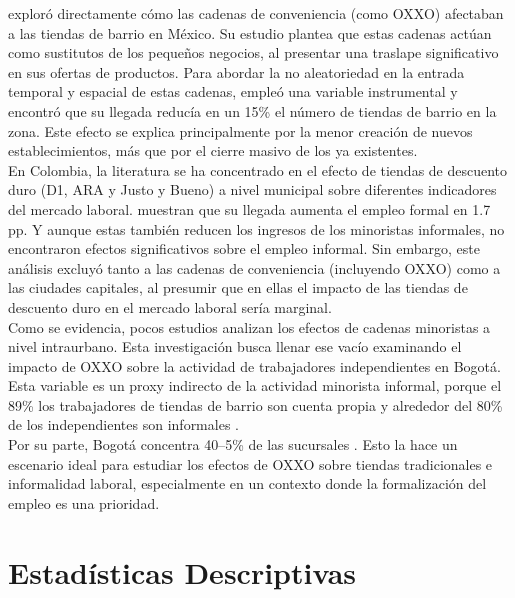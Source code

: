 \documentclass{article}
\begin{document}
\textcite{marcos2022} exploró directamente cómo las cadenas de conveniencia (como OXXO) afectaban a las tiendas de barrio en México. Su estudio plantea que estas cadenas actúan como sustitutos de los pequeños negocios, al presentar una traslape significativo en sus ofertas de productos. Para abordar la no aleatoriedad en la entrada temporal y espacial de estas cadenas, empleó una variable instrumental y encontró que su llegada reducía en un 15\% el número de tiendas de barrio en la zona. Este efecto se explica principalmente por la menor creación de nuevos establecimientos, más que por el cierre masivo de los ya existentes. \\

En Colombia, la literatura se ha concentrado en el efecto de tiendas de descuento duro (D1, ARA y Justo y Bueno) a nivel municipal sobre diferentes indicadores del mercado laboral. \textcite{delgado2024} muestran que su llegada aumenta el empleo formal en 1.7 pp. Y aunque estas también reducen los ingresos de los minoristas informales, no encontraron efectos significativos sobre el empleo informal. Sin embargo, este análisis excluyó tanto a las cadenas de conveniencia (incluyendo OXXO) como a las ciudades capitales, al presumir que en ellas el impacto de las tiendas de descuento duro en el mercado laboral sería marginal. \\

Como se evidencia, pocos estudios analizan los efectos de cadenas minoristas a nivel intraurbano. Esta investigación busca llenar ese vacío examinando el impacto de OXXO sobre la actividad de trabajadores independientes en Bogotá. Esta variable es un proxy indirecto de la actividad minorista informal, porque el 89\% los trabajadores de tiendas de barrio son cuenta propia \parencite{DANE2025a} y alrededor del 80\% de los independientes son informales \parencite{llanes2025}. \\

Por su parte, Bogotá concentra 40–5\% de las sucursales \parencite{godoy2025}. Esto la hace un escenario ideal para estudiar los efectos de OXXO sobre tiendas tradicionales e informalidad laboral, especialmente en un contexto donde la formalización del empleo es una prioridad.\\

\section{Estadísticas Descriptivas} 
\end{document}
